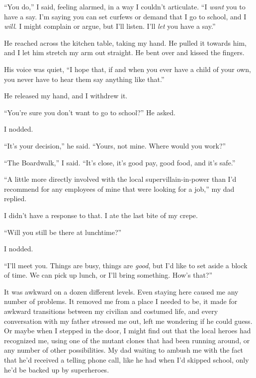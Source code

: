 ``You do,'' I said, feeling alarmed, in a way I couldn't articulate.  ``I \emph{want} you to have a say.  I'm saying you can set curfews or demand that I go to school, and I \emph{will}.  I might complain or argue, but I'll listen.  I'll \emph{let} you have a say.''



He reached across the kitchen table, taking my hand.  He pulled it towards him, and I let him stretch my arm out straight.  He bent over and kissed the fingers.



His voice was quiet, ``I hope that, if and when you ever have a child of your own, you never have to hear them say anything like that.''



He released my hand, and I withdrew it.



``You're sure you don't want to go to school?''  He asked.



I nodded.



``It's your decision,'' he said.  ``Yours, not mine.  Where would you work?''



``The Boardwalk,'' I said.  ``It's close, it's good pay, good food, and it's safe.''



``A little more directly involved with the local supervillain-in-power than I'd recommend for  any employees of mine that were looking for a job,'' my dad replied.



I didn't have a response to that.  I ate the last bite of my crepe.



``Will you still be there at lunchtime?''



I nodded.



``I'll meet you.  Things are busy, things are \emph{good}, but I'd like to set aside a block of time.  We can pick up lunch, or I'll bring something.  How's that?''



It was awkward on a dozen different levels.  Even staying here caused me any number of problems.  It removed me from a place I needed to be, it made for awkward transitions between my civilian and costumed life, and every conversation with my father stressed me out, left me wondering if he could guess.  Or maybe when I stepped in the door, I might find out that the local heroes had recognized me, using one of the mutant clones that had been running around, or any number of other possibilities.  My dad waiting to ambush me with the fact that he'd received a telling phone call, like he had when I'd skipped school, only he'd be backed up by superheroes.




